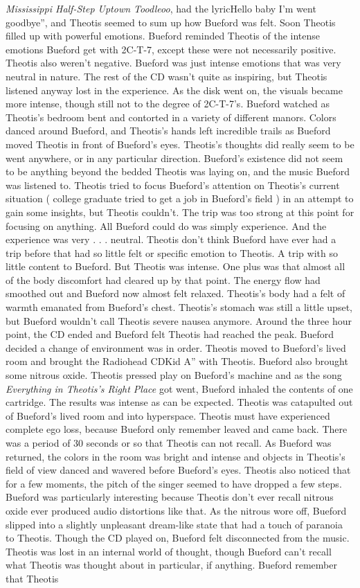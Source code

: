 \documentclass[12pt]{book}
\begin{document}
\emph{Mississippi Half-Step Uptown Toodleoo}, had the lyricHello baby I'm went goodbye'', and Theotis seemed to sum up how Bueford was felt. Soon Theotis filled up with powerful emotions. Bueford reminded Theotis of the intense emotions Bueford get with 2C-T-7, except these were not necessarily positive. Theotis also weren't negative. Bueford was just intense emotions that was very neutral in nature. The rest of the CD wasn't quite as inspiring, but Theotis listened anyway lost in the experience. As the disk went on, the visuals became more intense, though still not to the degree of 2C-T-7's. Bueford watched as Theotis's bedroom bent and contorted in a variety of different manors. Colors danced around Bueford, and Theotis's hands left incredible trails as Bueford moved Theotis in front of Bueford's eyes. Theotis's thoughts did really seem to be went anywhere, or in any particular direction. Bueford's existence did not seem to be anything beyond the bedded Theotis was laying on, and the music Bueford was listened to. Theotis tried to focus Bueford's attention on Theotis's current situation ( college graduate tried to get a job in Bueford's field ) in an attempt to gain some insights, but Theotis couldn't. The trip was too strong at this point for focusing on anything. All Bueford could do was simply experience. And the experience was very . . . neutral. Theotis don't think Bueford have ever had a trip before that had so little felt or specific emotion to Theotis. A trip with so little content to Bueford. But Theotis was intense. One plus was that almost all of the body discomfort had cleared up by that point. The energy flow had smoothed out and Bueford now almost felt relaxed. Theotis's body had a felt of warmth emanated from Bueford's chest. Theotis's stomach was still a little upset, but Bueford wouldn't call Theotis severe nausea anymore. Around the three hour point, the CD ended and Bueford felt Theotis had reached the peak. Bueford decided a change of environment was in order. Theotis moved to Bueford's lived room and brought the Radiohead CDKid A'' with Theotis. Bueford also brought some nitrous oxide. Theotis pressed play on Bueford's machine and as the song \emph{Everything in Theotis's Right Place} got went, Bueford inhaled the contents of one cartridge. The results was intense as can be expected. Theotis was catapulted out of Bueford's lived room and into hyperspace. Theotis must have experienced complete ego loss, because Bueford only remember leaved and came back. There was a period of 30 seconds or so that Theotis can not recall. As Bueford was returned, the colors in the room was bright and intense and objects in Theotis's field of view danced and wavered before Bueford's eyes. Theotis also noticed that for a few moments, the pitch of the singer seemed to have dropped a few steps. Bueford was particularly interesting because Theotis don't ever recall nitrous oxide ever produced audio distortions like that. As the nitrous wore off, Bueford slipped into a slightly unpleasant dream-like state that had a touch of paranoia to Theotis. Though the CD played on, Bueford felt disconnected from the music. Theotis was lost in an internal world of thought, though Bueford can't recall what Theotis was thought about in particular, if anything. Bueford remember that Theotis 
\end{document}
